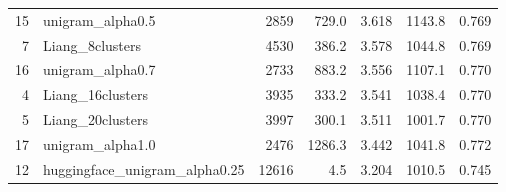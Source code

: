 \begin{table}
\begin{tabular}{rlrrrrr}
15 & unigram\_alpha0.5 & 2859 & 729.0 & 3.618 & 1143.8 & 0.769 \\
7 & Liang\_8clusters & 4530 & 386.2 & 3.578 & 1044.8 & 0.769 \\
16 & unigram\_alpha0.7 & 2733 & 883.2 & 3.556 & 1107.1 & 0.770 \\
4 & Liang\_16clusters & 3935 & 333.2 & 3.541 & 1038.4 & 0.770 \\
5 & Liang\_20clusters & 3997 & 300.1 & 3.511 & 1001.7 & 0.770 \\
17 & unigram\_alpha1.0 & 2476 & 1286.3 & 3.442 & 1041.8 & 0.772 \\
12 & huggingface\_unigram\_alpha0.25 & 12616 & 4.5 & 3.204 & 1010.5 & 0.745 \\
\bottomrule
\end{tabular}
\end{table}
